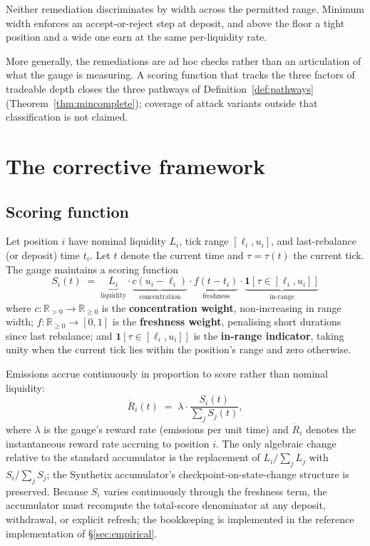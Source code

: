 \documentclass[11pt,a4paper]{article}
\theoremstyle{definition}
\theoremstyle{plain}
\theoremstyle{remark}
\begin{document}
Neither remediation discriminates by width across the permitted range. Minimum width enforces an accept-or-reject step at deposit, and above the floor a tight position and a wide one earn at the same per-liquidity rate.

More generally, the remediations are ad hoc checks rather than an articulation of what the gauge is measuring. A scoring function that tracks the three factors of tradeable depth closes the three pathways of Definition~\ref{def:pathways} (Theorem~\ref{thm:mincomplete}); coverage of attack variants outside that classification is not claimed.

\section{The corrective framework}\label{sec:framework}

\subsection{Scoring function}\label{sec:scoring}

Let position $i$ have nominal liquidity $L_i$, tick range $[\ell_i, u_i]$, and last-rebalance (or deposit) time $t_i$. Let $t$ denote the current time and $\tau = \tau(t)$ the current tick. The gauge maintains a scoring function
\begin{equation}\label{eq:score}
S_i(t) \;=\; \underbrace{L_i}_{\text{liquidity}} \cdot \underbrace{c(u_i - \ell_i)}_{\text{concentration}} \cdot \underbrace{f(t - t_i)}_{\text{freshness}} \cdot \underbrace{\mathbf{1}[\tau \in [\ell_i, u_i]]}_{\text{in-range}}
\end{equation}
where $c : \mathbb{R}_{>0} \to \mathbb{R}_{\geq 0}$ is the \textbf{concentration weight}, non-increasing in range width; $f : \mathbb{R}_{\geq 0} \to [0, 1]$ is the \textbf{freshness weight}, penalising short durations since last rebalance; and $\mathbf{1}[\tau \in [\ell_i, u_i]]$ is the \textbf{in-range indicator}, taking unity when the current tick lies within the position's range and zero otherwise.

Emissions accrue continuously in proportion to score rather than nominal liquidity:
\begin{equation}\label{eq:reward}
\dot R_i(t) \;=\; \lambda \cdot \frac{S_i(t)}{\sum_j S_j(t)},
\end{equation}
where $\lambda$ is the gauge's reward rate (emissions per unit time) and $\dot R_i$ denotes the instantaneous reward rate accruing to position $i$. The only algebraic change relative to the standard accumulator is the replacement of $L_i / \sum_j L_j$ with $S_i / \sum_j S_j$; the Synthetix accumulator's checkpoint-on-state-change structure is preserved. Because $S_i$ varies continuously through the freshness term, the accumulator must recompute the total-score denominator at any deposit, withdrawal, or explicit refresh; the bookkeeping is implemented in the reference implementation of \S\ref{sec:empirical}.
\end{document}
